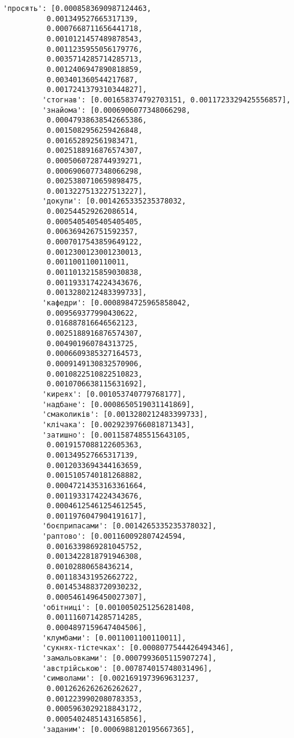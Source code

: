\documentclass[11pt]{article}
\begin{document}
\begin{Verbatim}[commandchars=\\\{\}]
         'просять': [0.0008583690987124463,
          0.001349527665317139,
          0.0007668711656441718,
          0.0010121457489878543,
          0.0011235955056179776,
          0.0035714285714285713,
          0.0012406947890818859,
          0.003401360544217687,
          0.0017241379310344827],
         'стогнав': [0.001658374792703151, 0.0011723329425556857],
         'знайома': [0.0006906077348066298,
          0.00047938638542665386,
          0.0015082956259426848,
          0.001652892561983471,
          0.0025188916876574307,
          0.0005060728744939271,
          0.0006906077348066298,
          0.0025380710659898475,
          0.0013227513227513227],
         'докупи': [0.0014265335235378032,
          0.002544529262086514,
          0.0005405405405405405,
          0.006369426751592357,
          0.0007017543859649122,
          0.0012300123001230013,
          0.0011001100110011,
          0.0011013215859030838,
          0.0011933174224343676,
          0.0013280212483399733],
         'кафедри': [0.0008984725965858042,
          0.009569377990430622,
          0.016887816646562123,
          0.0025188916876574307,
          0.004901960784313725,
          0.0006609385327164573,
          0.0009149130832570906,
          0.0010822510822510823,
          0.0010706638115631692],
         'киреях': [0.001053740779768177],
         'надбане': [0.0008650519031141869],
         'смаколиків': [0.0013280212483399733],
         'клічака': [0.0029239766081871343],
         'затишно': [0.0011587485515643105,
          0.0019157088122605363,
          0.001349527665317139,
          0.0012033694344163659,
          0.0015105740181268882,
          0.00047214353163361664,
          0.0011933174224343676,
          0.00046125461254612545,
          0.0011976047904191617],
         'боєприпасами': [0.0014265335235378032],
         'раптово': [0.001160092807424594,
          0.0016339869281045752,
          0.0013422818791946308,
          0.00102880658436214,
          0.001183431952662722,
          0.0014534883720930232,
          0.0005461496450027307],
         'обітниці': [0.0010050251256281408,
          0.0011160714285714285,
          0.0004897159647404506],
         'клумбами': [0.0011001100110011],
         'сукнях-тістечках': [0.0008077544426494346],
         'замальовками': [0.0007993605115907274],
         'австрійською': [0.007874015748031496],
         'символами': [0.0021691973969631237,
          0.0012626262626262627,
          0.0012239902080783353,
          0.0005963029218843172,
          0.0005402485143165856],
         'заданим': [0.0006988120195667365],

\end{Verbatim}
\end{document}
